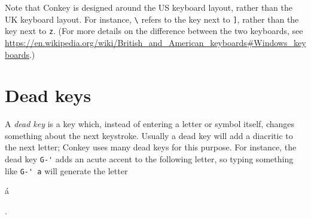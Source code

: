 \documentclass[oneside]{memoir}
\newcommand{\key}{\verb}
\newcommand{\out}[1]{\colorbox{gray!20}{\strut{}#1}}
\begin{document}
Note that Conkey is designed around the US keyboard layout, rather than the UK keyboard layout.
For instance, \key|\| refers to the key next to \key|]|, rather than the key next to \key|z|.
(For more details on the difference between the two keyboards, see \url{https://en.wikipedia.org/wiki/British_and_American_keyboards#Windows_keyboards}.)

\section{Dead keys}
\label{sec:dead_keys}

A \textit{dead key} is a key which, instead of entering a letter or symbol itself, changes something about the next keystroke.
Usually a dead key will add a diacritic to the next letter; Conkey uses many dead keys for this purpose.
For instance, the dead key \key|G-'| adds an acute accent to the following letter,
  so typing something like \key|G-' a| will generate the letter~\out{á}.
\end{document}
